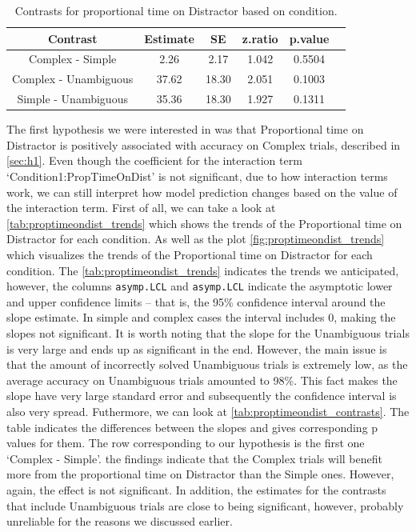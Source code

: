 \begin{table}[h!]
\centering
\begin{tabular}{|c|c|c|c|c|c|}
\hline
\textbf{Contrast} & \textbf{Estimate} & \textbf{SE} & \textbf{z.ratio} & \textbf{p.value} \\ \hline
Complex - Simple & 2.26 & 2.17 & 1.042 & 0.5504 \\ \hline
Complex - Unambiguous & 37.62 & 18.30 & 2.051 & 0.1003 \\ \hline
Simple - Unambiguous & 35.36 & 18.30 & 1.927 & 0.1311 \\ \hline
\end{tabular}
\caption{Contrasts for proportional time on Distractor based on condition.}
\label{tab:proptimeondist_contrasts}
\end{table}

The first hypothesis we were interested in was that Proportional time on Distractor is positively associated with accuracy on Complex trials, described in \autoref{sec:h1}. Even though the coefficient for the interaction term `Condition1:PropTimeOnDist' is not significant, due to how interaction terms work, we can still interpret how model prediction changes based on the value of the interaction term. First of all, we can take a look at \autoref{tab:proptimeondist_trends} which shows the trends of the Proportional time on Distractor for each condition. As well as the plot \autoref{fig:proptimeondist_trends} which visualizes the trends of the Proportional time on Distractor for each condition. The \autoref{tab:proptimeondist_trends} indicates the trends we anticipated, however, the columns \texttt{asymp.LCL} and \texttt{asymp.LCL} indicate the asymptotic lower and upper confidence limits -- that is, the 95\% confidence interval around the slope estimate. In simple and complex cases the interval includes 0, making the slopes not significant. It is worth noting that the slope for the Unambiguous trials is very large and ends up as significant in the end. However, the main issue is that the amount of incorrectly solved Unambiguous trials is extremely low, as the average accuracy on Unambiguous trials amounted to 98\%. This fact makes the slope have very large standard error and subsequently the confidence interval is also very spread. Futhermore, we can look at \autoref{tab:proptimeondist_contrasts}. The table indicates the differences between the slopes and gives corresponding p values for them. The row corresponding to our hypothesis is the first one `Complex - Simple'. the findings indicate that the Complex trials will benefit more from the proportional time on Distractor than the Simple ones. However, again, the effect is not significant. In addition, the estimates for the contrasts that include Unambiguous trials are close to being significant, however, probably unreliable for the reasons we discussed earlier.

